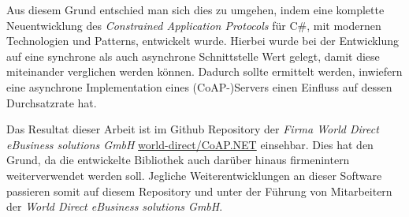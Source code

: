 Aus diesem Grund entschied man sich dies zu umgehen, indem eine komplette Neuentwicklung des \textit{Constrained Application Protocols} für C\#, mit modernen Technologien und Patterns, entwickelt wurde. Hierbei wurde bei der Entwicklung auf eine synchrone als auch asynchrone Schnittstelle Wert gelegt, damit diese miteinander verglichen werden können. Dadurch sollte ermittelt werden, inwiefern eine asynchrone Implementation eines (CoAP-)Servers einen Einfluss auf dessen Durchsatzrate hat.

Das Resultat dieser Arbeit ist im Github Repository der \textit{Firma World Direct eBusiness solutions GmbH} \href{https://github.com/world-direct/CoAP.NET}{world-direct/CoAP.NET} einsehbar. Dies hat den Grund, da die entwickelte Bibliothek auch darüber hinaus firmenintern weiterverwendet werden soll. Jegliche Weiterentwicklungen an dieser Software passieren somit auf diesem Repository und unter der Führung von Mitarbeitern der \textit{World Direct eBusiness solutions GmbH}.